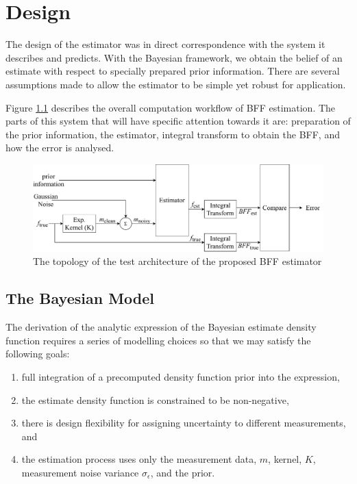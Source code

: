 \chapter{Design}\label{C:design}

The design of the estimator was in direct correspondence with the system it describes and predicts. With the Bayesian framework, we obtain the belief of an estimate with respect to specially prepared prior information. There are several assumptions made to allow the estimator to be simple yet robust for application.


Figure \ref{fig:test_topology} describes the overall computation workflow of BFF estimation. The parts of this system that will have specific attention towards it are: preparation of the prior information, the estimator, integral transform to obtain the BFF, and how the error is analysed.


\begin{figure}[h]
    \centering
    \includegraphics[width=\textwidth]{design/SystemWorkflow489.pdf}
    \caption{The topology of the test architecture of the proposed BFF estimator}
    \label{fig:test_topology}
\end{figure}


\section{The Bayesian Model} \label{section:bayesTechniqueDesign}
The derivation of the analytic expression of the Bayesian estimate density function requires a series of modelling choices so that we may satisfy the following goals:

\begin{enumerate}
\item full integration of a precomputed density function prior into the expression,
\item the estimate density function is constrained to be non-negative,
\item there is design flexibility for assigning uncertainty to different measurements, and
\item the estimation process uses only the measurement data, $m$, kernel, $K$, measurement noise variance $\sigma_\epsilon$, and the prior.
\end{enumerate}


